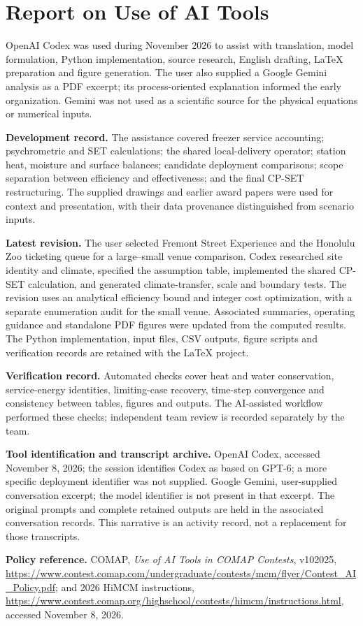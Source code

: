 \section*{Report on Use of AI Tools}
OpenAI Codex was used during November 2026 to assist with translation, model formulation, Python implementation, source research, English drafting, LaTeX preparation and figure generation. The user also supplied a Google Gemini analysis as a PDF excerpt; its process-oriented explanation informed the early organization. Gemini was not used as a scientific source for the physical equations or numerical inputs.

\noindent\textbf{Development record.} The assistance covered freezer service accounting; psychrometric and SET calculations; the shared local-delivery operator; station heat, moisture and surface balances; candidate deployment comparisons; scope separation between efficiency and effectiveness; and the final CP-SET restructuring. The supplied drawings and earlier award papers were used for context and presentation, with their data provenance distinguished from scenario inputs.

\noindent\textbf{Latest revision.} The user selected Fremont Street Experience and the Honolulu Zoo ticketing queue for a large--small venue comparison. Codex researched site identity and climate, specified the assumption table, implemented the shared CP-SET calculation, and generated climate-transfer, scale and boundary tests. The revision uses an analytical efficiency bound and integer cost optimization, with a separate enumeration audit for the small venue. Associated summaries, operating guidance and standalone PDF figures were updated from the computed results. The Python implementation, input files, CSV outputs, figure scripts and verification records are retained with the LaTeX project.

\noindent\textbf{Verification record.} Automated checks cover heat and water conservation, service-energy identities, limiting-case recovery, time-step convergence and consistency between tables, figures and outputs. The AI-assisted workflow performed these checks; independent team review is recorded separately by the team.

\noindent\textbf{Tool identification and transcript archive.} OpenAI Codex, accessed November 8, 2026; the session identifies Codex as based on GPT-6; a more specific deployment identifier was not supplied. Google Gemini, user-supplied conversation excerpt; the model identifier is not present in that excerpt. The original prompts and complete retained outputs are held in the associated conversation records. This narrative is an activity record, not a replacement for those transcripts.

\noindent\textbf{Policy reference.} COMAP, \emph{Use of AI Tools in COMAP Contests}, v102025, \url{https://www.contest.comap.com/undergraduate/contests/mcm/flyer/Contest_AI_Policy.pdf}; and 2026 HiMCM instructions, \url{https://www.contest.comap.org/highschool/contests/himcm/instructions.html}, accessed November 8, 2026.
